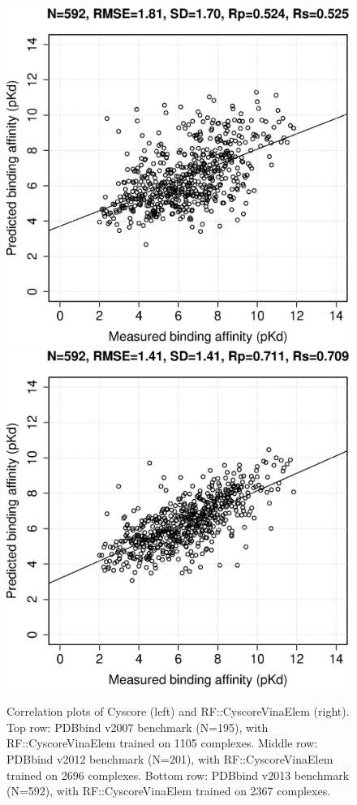 \documentclass[journal=jacsat,manuscript=article]{achemso}
\begin{document}
\begin{figure}[h!]
\endminipage
\\
\includegraphics[width=\linewidth]{../rfcyscore/x4/mlr/trn-247-tst-592-yp.eps}
\endminipage
{}
\includegraphics[width=\linewidth]{../rfcyscore/x46/rf/trn-2367-tst-592-yp.eps}
\endminipage
\caption{Correlation plots of Cyscore (left) and RF::CyscoreVinaElem (right). Top row: PDBbind v2007 benchmark (N=195), with RF::CyscoreVinaElem trained on 1105 complexes. Middle row: PDBbind v2012 benchmark (N=201), with RF::CyscoreVinaElem trained on 2696 complexes. Bottom row: PDBbind v2013 benchmark (N=592), with RF::CyscoreVinaElem trained on 2367 complexes.}
\label{fig:cor}
\end{figure}
\end{document}
